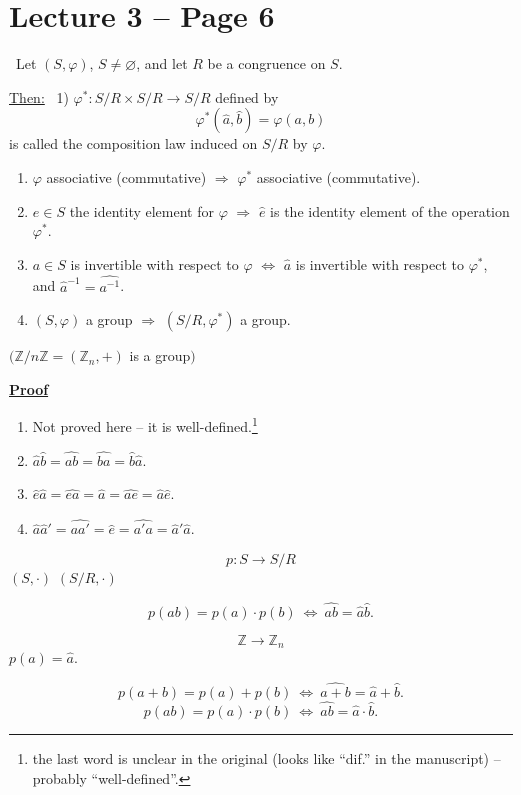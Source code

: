 \documentclass[12pt]{article}
\begin{document}
\section*{Lecture 3 -- Page 6}

\noindent{} \ Let $(S,\varphi)$, $S\neq\varnothing$, and let $R$ be a congruence on $S$.

\bigskip
\noindent\underline{Then:} \ 1) $\varphi^* : S/R\times S/R \to S/R$ defined by
\[
\varphi^*(\hat a,\hat b) = \varphi(a,b)
\]
is called the composition law induced on $S/R$ by $\varphi$.

\begin{enumerate}
\item[(2)] $\varphi$ associative (commutative) $\Rightarrow$ $\varphi^*$ associative (commutative).
\item[(3)] $e\in S$ the identity element for $\varphi$ $\Rightarrow$ $\hat e$ is the identity element of the operation $\varphi^*$.
\item[(4)] $a\in S$ is invertible with respect to $\varphi$ $\Leftrightarrow$ $\hat a$ is invertible with respect to $\varphi^*$, and $\hat a^{-1} = \widehat{a^{-1}}$.
\item[(5)] $(S,\varphi)$ a group $\Rightarrow$ $(S/R,\varphi^*)$ a group.
\end{enumerate}

\noindent $\big(\mathbb{Z}/n\mathbb{Z} = (\mathbb{Z}_n,+)$ is a group$\big)$

\bigskip
\noindent\underline{\textbf{Proof}}

\begin{enumerate}
\item[(1)] Not proved here -- it is well-defined.\footnote{the last word is unclear in the original (looks like ``dif.'' in the manuscript) -- probably ``well-defined''.}
\item[(2)] $\hat a\hat b = \widehat{ab} = \widehat{ba} = \hat b\hat a$.
\item[(3)] $\hat e\hat a = \widehat{ea} = \hat a = \widehat{ae} = \hat a\hat e$.
\item[(4)] $\hat a\hat a' = \widehat{aa'} = \hat e = \widehat{a'a} = \hat a'\hat a$.
\end{enumerate}

\[
p : S \to S/R
\]
\noindent $(S,\cdot)$ \hspace{2cm} $(S/R,\cdot)$

\[
p(ab) = p(a)\cdot p(b) \ \Leftrightarrow\ \widehat{ab} = \hat a\hat b.
\]

\[
\mathbb{Z} \to \mathbb{Z}_n
\]
\noindent $p(a) = \hat a$.

\[
p(a+b) = p(a)+p(b) \ \Leftrightarrow\ \widehat{a+b} = \hat a+\hat b.
\]
\[
p(ab) = p(a)\cdot p(b) \ \Leftrightarrow\ \widehat{ab} = \hat a\cdot\hat b.
\]
\end{document}
